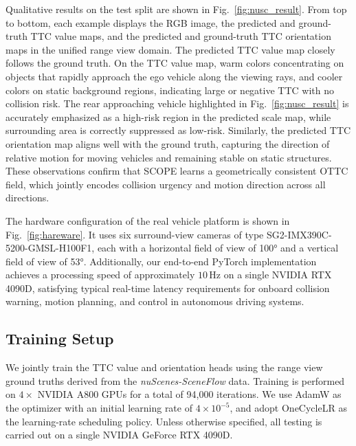 \documentclass[journal]{IEEEtran}
\begin{document}
Qualitative results on the test split are shown in Fig.~\ref{fig:nusc_result}. 
From top to bottom, each example displays the RGB image, the predicted and ground-truth TTC value maps, and the predicted and ground-truth TTC orientation maps in the unified range view domain. 
The predicted TTC value map closely follows the ground truth. On the TTC value map, warm colors concentrating on objects that rapidly approach the ego vehicle along the viewing rays, and cooler colors on static background regions, indicating large or negative TTC with no collision risk. 
The rear approaching vehicle highlighted in Fig.~\ref{fig:nusc_result} is accurately emphasized as a high-risk region in the predicted scale map, while surrounding area is correctly suppressed as low-risk. 
Similarly, the predicted TTC orientation map aligns well with the ground truth, capturing the direction of relative motion for moving vehicles and remaining stable on static structures. 
These observations confirm that SCOPE learns a geometrically consistent OTTC field, which jointly encodes collision urgency and motion direction across all directions.

The hardware configuration of the real vehicle platform is shown in Fig.~\ref{fig:hareware}. It uses six surround-view cameras of type SG2-IMX390C-5200-GMSL-H100F1, each with a horizontal field of view of 100° and a vertical field of view of 53°.
Additionally, our end-to-end PyTorch implementation achieves a processing speed of approximately \(10\,\mathrm{Hz}\) on a single NVIDIA RTX 4090D, satisfying typical real-time latency requirements for onboard collision warning, motion planning, and control in autonomous driving systems. 


\subsection{Training Setup}

We jointly train the TTC value and orientation heads using the range view ground truths derived from the \textit{nuScenes-SceneFlow} data. Training is performed on \(4\times\) NVIDIA A800 GPUs for a total of 94{,}000 iterations. We use AdamW as the optimizer with an initial learning rate of \(4\times 10^{-5}\), and adopt OneCycleLR as the learning-rate scheduling policy. Unless otherwise specified, all testing is carried out on a single NVIDIA GeForce RTX 4090D.
\end{document}
